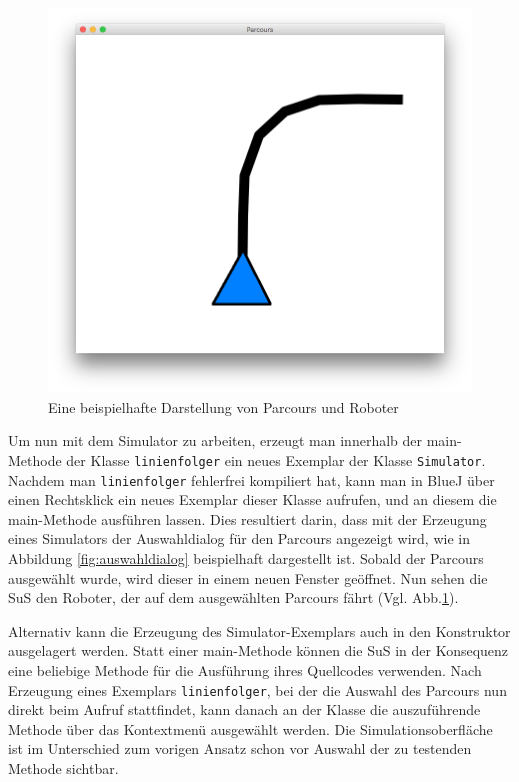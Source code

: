 \documentclass[paper=a4, DIV=calc, BCOR=12mm, twoside=on, onecolumn=on, open = right, titlepage =on, parskip =half-, headsepline = on, footsepline = off, chapterprefix = off, appendixprefix = on, fontsize = 12pt, numbers = noenddot, abstract = on]{scrbook}
\begin{document}
\begin{figure}[htbp]
\centering
\includegraphics[width=\textwidth]{images/simparcours_kurve.png} 
\caption{Eine beispielhafte Darstellung von Parcours und Roboter}
\label{fig:simparcours_kurve}
\end{figure}

Um nun mit dem Simulator zu arbeiten, erzeugt man innerhalb der main-Methode der Klasse \texttt{linienfolger} ein neues Exemplar der Klasse \texttt{Si\-mu\-la\-tor}. Nachdem man \texttt{linienfolger} fehlerfrei kompiliert hat, kann man in BlueJ über einen Rechtsklick ein neues Exemplar dieser Klasse aufrufen, und an diesem die main-Me\-tho\-de ausführen lassen. Dies resultiert darin, dass mit der Erzeugung eines Simulators der Auswahldialog für den Parcours angezeigt wird, wie in Abbildung \ref{fig:auswahldialog} beispielhaft dargestellt ist.
Sobald der Parcours ausgewählt wurde, wird dieser in einem neuen Fenster geöffnet. Nun sehen die SuS den Roboter, der auf dem ausgewählten Parcours fährt (Vgl. Abb.\ref{fig:simparcours_kurve}).

Alternativ kann die Erzeugung des Simulator-Exemplars auch in den Konstruktor ausgelagert werden. Statt einer main-Methode können die SuS in der Konsequenz eine beliebige Methode für die Ausführung ihres Quellcodes verwenden. Nach Erzeugung eines Exemplars \texttt{linienfolger}, bei der die Auswahl des Parcours nun direkt beim Aufruf stattfindet, kann danach an der Klasse die auszuführende Methode über das Kontextmenü ausgewählt werden. Die Simulationsoberfläche ist im Unterschied zum vorigen Ansatz schon vor Auswahl der zu testenden Methode sichtbar. 
\end{document}
